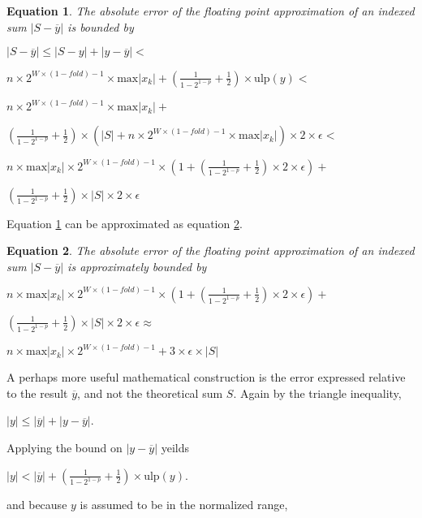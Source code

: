 \documentclass[12pt]{article}
\providecommand{\max}{\ensuremath{\text{max}}}
\providecommand{\ulp}{\ensuremath{\text{ulp}}}
\theoremstyle{plain}
\newtheorem{eq}{Equation}[section]
\begin{document}
    \begin{eq} The absolute error of the floating point approximation of an indexed sum $|S - \overline{y}|$ is bounded by

      $|S - \overline{y}| \leq |S - y| + |y - \overline{y}| <$

      $n \times 2^{W \times (1 - fold) - 1} \times \max|x_k| + (\frac{1}{1 - 2^{1 - p}} + \frac{1}{2})\times \ulp(y) < $

      $n \times 2^{W \times (1 - fold) - 1} \times \max|x_k| + $

      \indent \indent$(\frac{1}{1 - 2^{1 - p}} + \frac{1}{2})\times(|S| + n \times 2^{W \times (1 - fold) - 1} \times \max|x_k|) \times 2 \times \epsilon < $

      $n \times \max|x_k|\times 2^{W \times (1 - fold) - 1} \times(1 + (\frac{1}{1 - 2^{1 - p}} + \frac{1}{2}) \times 2 \times \epsilon) + $

      \indent \indent$(\frac{1}{1 - 2^{1 - p}} + \frac{1}{2})\times |S| \times 2 \times \epsilon$
      \label{eq:error}
    \end{eq}

    Equation \ref{eq:error} can be approximated as equation \ref{eq:errorapprox}.

    \begin{eq} The absolute error of the floating point approximation of an indexed sum $|S - \overline{y}|$ is approximately bounded by

      $n \times \max|x_k|\times 2^{W \times (1 - fold) - 1} \times(1 + (\frac{1}{1 - 2^{1 - p}} + \frac{1}{2}) \times 2 \times \epsilon) + $

      \indent \indent$(\frac{1}{1 - 2^{1 - p}} + \frac{1}{2})\times |S| \times 2 \times \epsilon \approx$

      $n \times \max|x_k|\times 2^{W \times (1 - fold) - 1} + 3 \times \epsilon \times |S|$
      \label{eq:errorapprox}
    \end{eq}

    A perhaps more useful mathematical construction is the error expressed relative to the result $\overline{y}$, and not the theoretical sum $S$. Again by the triangle inequality,

    $|y| \leq |\overline{y}| + |y - \overline{y}|$.

    Applying the bound on $|y - \overline{y}|$ yeilds

    $|y| < |\overline{y}| + (\frac{1}{1 - 2^{1 - p}} + \frac{1}{2})\times \ulp(y)$.

    and because $y$ is assumed to be in the normalized range,
\end{document}
